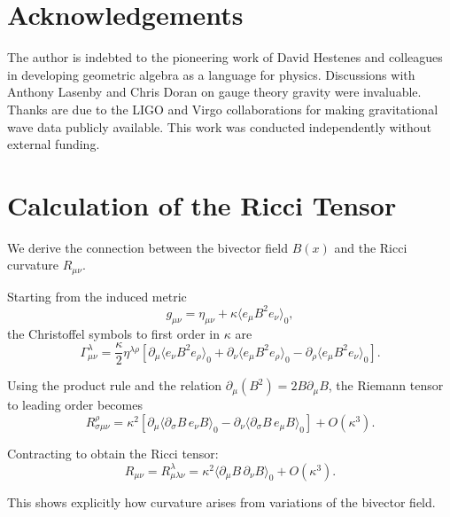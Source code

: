 \documentclass[11pt,a4paper]{article}
\numberwithin{equation}{section}
\theoremstyle{plain}
\theoremstyle{definition}
\theoremstyle{remark}
\begin{document}
\section*{Acknowledgements}
The author is indebted to the pioneering work of David Hestenes and colleagues in developing geometric algebra as a language for physics. Discussions with Anthony Lasenby and Chris Doran on gauge theory gravity were invaluable. Thanks are due to the LIGO and Virgo collaborations for making gravitational wave data publicly available. This work was conducted independently without external funding.
\fi

\appendix
\section{Calculation of the Ricci Tensor}
\label{app:ricci}

We derive the connection between the bivector field $B(x)$ and the Ricci curvature $R_{\mu\nu}$.

Starting from the induced metric
\begin{equation}
g_{\mu\nu} = \eta_{\mu\nu} + \kappa \langle e_\mu B^2 e_\nu \rangle_0,
\end{equation}
the Christoffel symbols to first order in $\kappa$ are
\begin{equation}
\Gamma^\lambda_{\mu\nu} = \frac{\kappa}{2} \eta^{\lambda\rho} \left[\partial_\mu \langle e_\nu B^2 e_\rho \rangle_0 + \partial_\nu \langle e_\mu B^2 e_\rho \rangle_0 - \partial_\rho \langle e_\mu B^2 e_\nu \rangle_0\right].
\end{equation}

Using the product rule and the relation $\partial_\mu (B^2) = 2 B \partial_\mu B$, the Riemann tensor to leading order becomes
\begin{equation}
R^\rho_{\sigma\mu\nu} = \kappa^2 \left[\partial_\mu \langle \partial_\sigma B \, e_\nu B \rangle_0 - \partial_\nu \langle \partial_\sigma B \, e_\mu B \rangle_0\right] + O(\kappa^3).
\end{equation}

Contracting to obtain the Ricci tensor:
\begin{equation}
R_{\mu\nu} = R^\lambda_{\mu\lambda\nu} = \kappa^2 \langle \partial_\mu B \, \partial_\nu B \rangle_0 + O(\kappa^3).
\end{equation}

This shows explicitly how curvature arises from variations of the bivector field.
\end{document}
